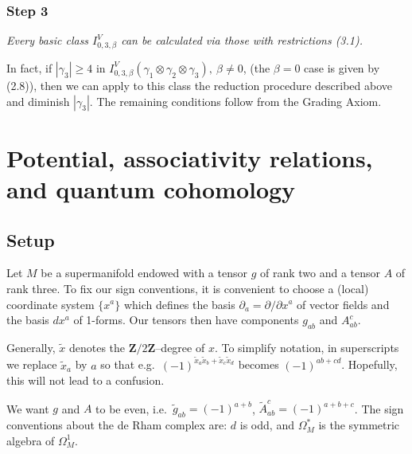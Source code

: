 \documentclass[reqno]{amsart}
\theoremstyle{definition}
\begin{document}
\medskip

\subsubsection{Step 3}
{\it
  Every basic class $I^V_{0,3,\beta}$
  can be calculated via those with restrictions (3.1).
}

\smallskip

In fact, if $|\gamma_3|\ge 4$ in $I^V_{0,3,\beta}(\gamma_1\otimes
\gamma_2\otimes\gamma_3),\ \beta \ne 0$, (the $\beta =0$ case
is given by (2.8)), then we can apply to this class the
reduction procedure described above and diminish $|\gamma_3|$.
The remaining conditions follow from the Grading Axiom.

\newpage


\section{Potential, associativity relations, and quantum cohomology}

\bigskip

\subsection{Setup}
Let $M$ be a supermanifold endowed with a tensor $g$ of rank
two and a tensor $A$ of rank three. To fix our sign conventions, it
is convenient to choose a (local) coordinate system $\{ x^a\}$
which defines the basis $\partial_a=\partial /\partial x^a$
of vector fields and the basis $dx^a$ of 1-forms. Our tensors
then have components $g_{ab}$ and $A_{ab}^c$.

\smallskip

Generally, $\tilde{x}$ denotes the $\mathbf{Z}/2\mathbf{Z}$--degree of $x$.
To simplify notation, in superscripts we replace $\tilde{x}_a$ by $a$
so that e.g.\ $(-1)^{\tilde{x}_a\tilde{x}_b+\tilde{x}_c\tilde{x}_d}$
becomes $(-1)^{ab+cd}$. Hopefully, this will not lead to a confusion.

\smallskip

We want $g$ and $A$ to be even, i.e.\ $\tilde{g}_{ab}=(-1)^{a+b}$,
$\tilde{A}_{ab}^c=(-1)^{a+b+c}$.
The sign conventions about the de Rham complex are:
$d$ is odd, and $\Omega^*_M$ is the symmetric
algebra of $\Omega^1_M$.
\end{document}
